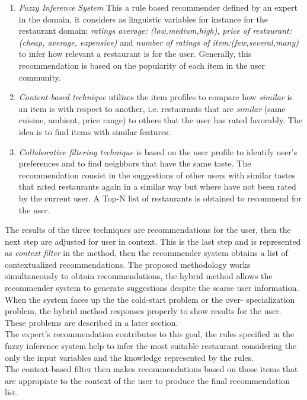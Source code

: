 \begin{enumerate} 
\item \textit{Fuzzy Inference System} This a rule based recommender
defined by an expert in the domain, it considers as linguistic
variables for instance for the restaurant domain: \textit{ratings
average: (low,medium,high)}, \textit{price of restaurant:(cheap,
average, expensive)} and \textit{number of ratings of
item:(few,several,many)} to infer how relevant a restaurant is for the
user. Generally, this recommendation is based on the popularity of
each item in the user community.
\item \textit{Content-based technique} utilizes the item profiles 
to compare how \textit{similar} is an item is with respect to 
another, i.e. restaurants that are \textit{similar} (same cuisine, 
ambient, price range)  to others that the user has rated favorably. 
The idea is to find items with similar features. 
\item \textit{Collaborative filtering technique} is based on the user
profile to identify user's preferences and to find neighbors that
have the same taste. The recommendation consist in the suggestions of
other users with similar tastes that rated restaurants again in a
similar way but where have not been rated by the current user. A Top-N
list of restaurants is obtained to recommend for the user.
\end{enumerate} 
The results of the three techniques are recommendations for the user,
then the next step are adjusted  for user in context. This is the last
step and is represented as \textit{context filter} in the method, then
the recommender system obtains a list of contextualized
recommendations. The proposed methodology works simultaneously to
obtain recommendations, the hybrid method allows the recommender
system to generate suggestions despite the scarse user information.
When the system faces up the the cold-start problem or the over-
specialization problem, the hybrid method responses properly to show
results for the user. These problems are described in a later
section. \\
The expert's recommendation contributes to this goal, the rules
specified in the fuzzy inference system help to infer the most
suitable restaurant considering the only the input variables and the
knowledge represented by the rules.\\ The context-based filter then
makes recommendations based on those items that are appropiate to the
context of the user to produce the final recommendation list. \\

